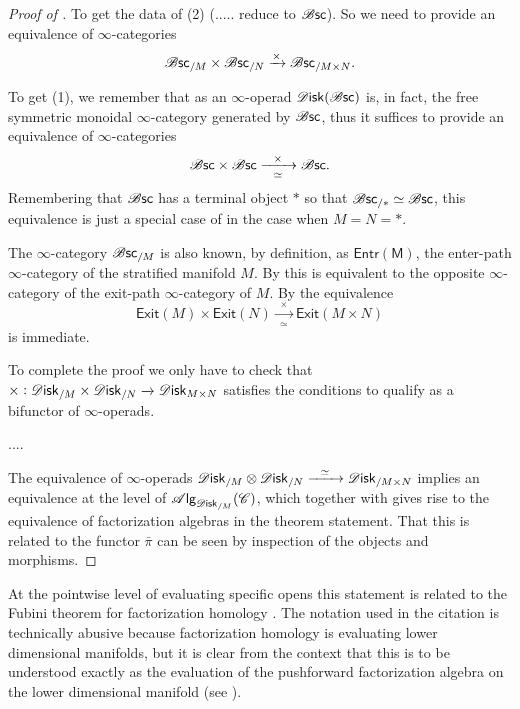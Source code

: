 \documentclass[../text.tex]{subfiles}
\begin{document}
\begin{proof}[Proof of ]
    To get the data of (2) (..... reduce to $\mathscr{B} \mathsf{sc}$). So we need to provide an equivalence of $\infty$-categories
    \begin{equation}\label{eq:b/M_x_b/N=b/MxN}
        \mathscr{B} \mathsf{sc}_{/M} \times \mathscr{B} \mathsf{sc}_{/N} \xrightarrow{\times} \mathscr{B} \mathsf{sc}_{/M \times N}.
    \end{equation}

    To get (1), we remember that as an $\infty$-operad $\disk(\bsc)$ is, in fact, the free symmetric monoidal $\infty$-category generated by $\mathscr{B} \mathsf{sc}$, thus it suffices to provide an equivalence of $\infty$-categories
    \begin{equation}
        \bsc \times \bsc \xrightarrow[\ \ \simeq \ \ ]{\times} \bsc.
    \end{equation}
    Remembering that $\mathscr{B} \mathsf{sc}$ has a terminal object $*$ so that $\mathscr{B} \mathsf{sc}_{/*} \simeq \mathscr{B} \mathsf{sc}$, this equivalence is just a special case of  in the case when $M = N = *$.

    The $\infty$-category $\mathscr{B} \mathsf{sc}_{/M}$ is also known, by definition, as $\mathsf{Entr(M)}$, the enter-path $\infty$-category of the stratified manifold $M$. By \cite[Lem.3.3.9]{afr_homhyp} this is equivalent to the opposite $\infty$-category of the exit-path $\infty$-category of $M$. By \cite[Obs.3.3.3]{afr_homhyp} the equivalence
    \begin{equation}
        \mathsf{Exit}(M) \times \mathsf{Exit}(N) \xrightarrow[\ \ \simeq \ \ ]{\times} \mathsf{Exit}(M \times N)
    \end{equation}
    is immediate.

    To complete the proof we only have to check that $\times: \disk_{/M} \times \disk_{/N} \xrightarrow{} \disk_{M \times N}$ satisfies the conditions to qualify as a bifunctor of $\infty$-operads.

    ....

    The equivalence of $\infty$-operads $\disk_{/M} \otimes \disk_{/N} \xrightarrow{\ \ \simeq \ \ } \disk_{/M \times N}$ implies an equivalence at the level of $\alg{\disk_{/M}} (\catC)$, which together with  gives rise to the equivalence of factorization algebras in the theorem statement. That this is related to the functor $\bar{\pi}$ can be seen by inspection of the objects and morphisms.
\end{proof}

\begin{remark}
    At the pointwise level of evaluating specific opens this statement is related to the Fubini theorem for factorization homology \cite[cor.2.29]{aft_fhstrat}. The notation used in the citation is technically abusive because factorization homology is evaluating lower dimensional manifolds, but it is clear from the context that this is to be understood exactly as the evaluation of the pushforward factorization algebra on the lower dimensional manifold (see ).
\end{remark}
\end{document}
